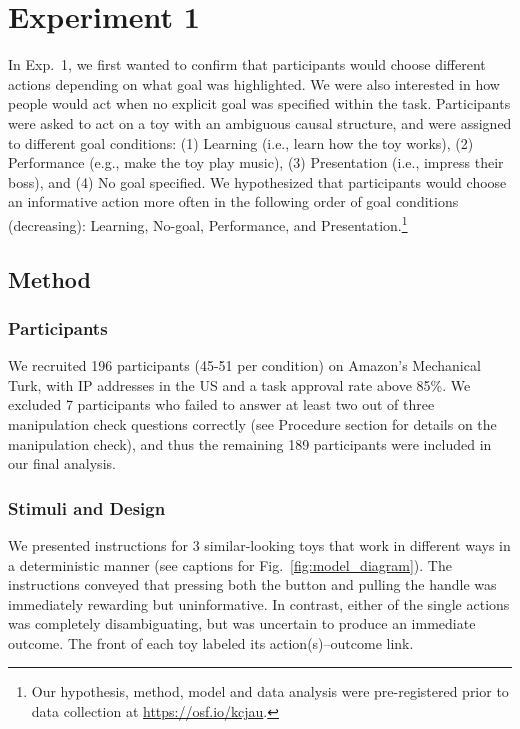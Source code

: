 \documentclass[10pt, letterpaper]{article}
\begin{document}
\section{Experiment 1}\label{experiment-1}

In Exp.~1, we first wanted to confirm that participants would choose
different actions depending on what goal was highlighted. We were also
interested in how people would act when no explicit goal was specified
within the task. Participants were asked to act on a toy with an
ambiguous causal structure, and were assigned to different goal
conditions: (1) Learning (i.e., learn how the toy works), (2)
Performance (e.g., make the toy play music), (3) Presentation (i.e.,
impress their boss), and (4) No goal specified. We hypothesized that
participants would choose an informative action more often in the
following order of goal conditions (decreasing): Learning, No-goal,
Performance, and
Presentation.\footnote{Our hypothesis, method, model and data analysis were pre-registered prior to data collection at \url{https://osf.io/kcjau}.}

\subsection{Method}\label{method}

\subsubsection{Participants}\label{participants}

We recruited 196 participants (45-51 per condition) on Amazon's
Mechanical Turk, with IP addresses in the US and a task approval rate
above 85\%. We excluded 7 participants who failed to answer at least two
out of three manipulation check questions correctly (see Procedure
section for details on the manipulation check), and thus the remaining
189 participants were included in our final analysis.

\subsubsection{Stimuli and Design}\label{stimuli-and-design}

We presented instructions for 3 similar-looking toys that work in
different ways in a deterministic manner (see captions for
Fig.~\ref{fig:model_diagram}). The instructions conveyed that pressing
both the button and pulling the handle was immediately rewarding but
uninformative. In contrast, either of the single actions was completely
disambiguating, but was uncertain to produce an immediate outcome. The
front of each toy labeled its action(s)--outcome link.
\end{document}
